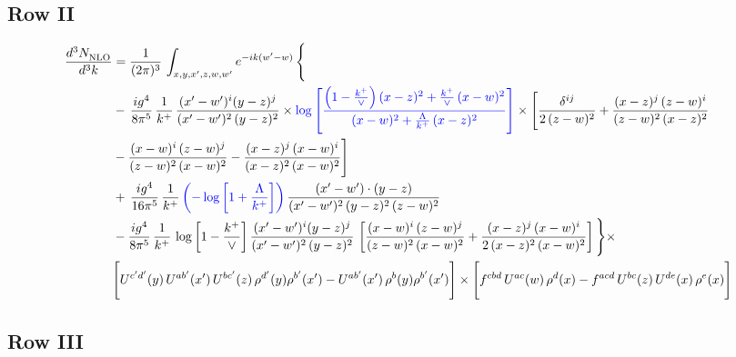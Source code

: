 \documentclass[9pt]{article}
\newcommand{\new}[1]{{\color{blue}#1}}
\numberwithin{equation}{section}
\begin{document}
\subsection{Row II}
\begin{align}
     \frac{d^{3}N_{\rm NLO}^{\rm}}{d^{3}k}  & =  \frac{1}{(2\pi)^{3}}\, \int_{x,y,x',z,w,w^{\prime}} e^{-ik(w^{\prime}-w)}\, \Bigg\{\notag \\ & -\,\frac{ig^{4}}{8\pi^{5}}\,\frac{1}{k^{+}}\,\frac{(x'-w')^{i}(y-z)^{j}}{(x'-w')^{2}\,(y-z)^{2}}\times \new{\log{\left[\frac{\left(1-\frac{k^{+}}{\vee}\right)(x-z)^{2}+\frac{k^{+}}{\vee}\,(x-w)^{2}}{(x-w)^{2}+\frac{\Lambda}{k^{+}}\,(x-z)^{2}}\right]}}\times \Bigg[\frac{\delta^{ij}}{2\,(z-w)^{2}}+\frac{(x-z)^{j}\,(z-w)^{i}}{(z-w)^{2}\,(x-z)^{2}}\notag \\ & -\frac{(x-w)^{i}\,(z-w)^{j}}{(z-w)^{2}\,(x-w)^{2}}-\frac{(x-z)^{j}\,(x-w)^{i}}{(x-z)^{2}\,(x-w)^{2}}\Bigg]\notag \\ & +\,\frac{ig^{4}}{16\pi^{5}}\,\frac{1}{k^{+}}\,\new{\left(-\log{\left[1+\frac{\Lambda}{k^{+}}\right]}\right)}\, \frac{(x'-w')\cdot (y-z)}{(x'-w')^{2}\,(y-z)^{2}\,(z-w)^{2}}\notag \\ & -\frac{ig^{4}}{8\pi^{5}}\,\frac{1}{k^{+}}\, \log{\left[1-\frac{k^{+}}{\vee}\right]}\,\frac{(x'-w')^{i}(y-z)^{j}}{(x'-w')^{2}\,(y-z)^{2}}\,\left[\frac{(x-w)^{i}\,(z-w)^{j}}{(z-w)^{2}\,(x-w)^{2}}+\frac{(x-z)^{j}\,(x-w)^{i}}{2\,(x-z)^{2}\, (x-w)^{2}}\right]\Bigg\}\times \notag \\ & \Bigg[U^{c'd'}(y)\,U^{ab'}(x')\,U^{bc'}(z)\,\rho^{d'}(y)\rho^{b'}(x')-U^{ab'}(x')\,\rho^{b}(y)\rho^{b'}(x')\Bigg]\times\Bigg[f^{cbd}\,U^{ac}(w)\,\rho^{d}(x)-f^{acd}\, U^{bc}(z)\,U^{de}(x)\,\rho^{e}(x)\Bigg]
\end{align}
 \subsection{Row III}
\end{document}
